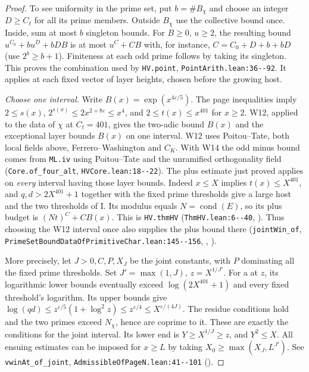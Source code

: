 \begin{proof}
To see uniformity in the prime set, put $b=\#B_\chi$ and choose an
integer $D\ge C_\ell$ for all its prime members. Outside $B_\chi$ use
the collective bound once. Inside, sum at most $b$ singleton bounds.
For $B\ge0$, $u\ge2$, the resulting bound
$u^{C_0}+bu^D+bDB$ is at most $u^{C}+CB$ with, for instance,
$C=C_0+D+b+bD$ (use $2^b\ge b+1$).
Finiteness at each odd prime follows by taking its singleton.
This proves the combination used by \nolinkurl{HV.point},
\nolinkurl{PointArith.lean:36--92}. It applies at each fixed vector
of layer heights, chosen before the growing host.

\emph{Choose one interval.}
Write $B(x)=\exp(x^{4\varepsilon/5})$. The page inequalities imply
$2\le s(x)$, $2^{s(x)}\le 2x^{2+8\varepsilon}\le x^4$,
and $2\le t(x)\le x^{401}$ for $x\ge2$.
W12, applied to the data of $\chi$ at $C_t=401$, gives the
two-adic bound $B(x)$ and the exceptional layer bounds $B(x)$ on
one interval. W12 uses Poitou--Tate, both local fields above,
Ferrero--Washington and $C_K$. With W14 the odd minus bound comes
from \nolinkurl{ML.iv} using Poitou--Tate and the unramified
orthogonality field (\nolinkurl{Core.of_four_alt}, \nolinkurl{HVCore.lean:18--22}).
The plus estimate just proved applies on \emph{every} interval
having those layer bounds. Indeed $x\le X$ implies $t(x)\le X^{401}$,
and $q,d>2X^{401}+1$ together with the fixed prime thresholds give
a large host and the two thresholds of I. Its modulus equals
$N=\operatorname{cond}(E)$, so its plus budget is $(Nt)^C+CB(x)$.
This is \nolinkurl{HV.thmHV} (\nolinkurl{ThmHV.lean:6--40},
). Thus choosing the W12 interval once also supplies
the plus bound there (\nolinkurl{jointWin_of},
\nolinkurl{PrimeSetBoundDataOfPrimitiveChar.lean:145--156},
, ).

More precisely, let $J>0,C,P,X_J$ be the joint constants, with $P$
dominating all the fixed prime thresholds. Set $J'=\max(1,J)$,
$z=X^{1/J'}$. For a  at $z$, its logarithmic lower
bounds eventually exceed $\log(2X^{401}+1)$ and every fixed threshold's
logarithm. Its upper bounds give
$\log(qd)\le z^{\varepsilon/5}(1+\log^2 z)\le z^{\varepsilon/4}
\le X^{\varepsilon/(4J)}$. The residue conditions hold and the
two primes exceed $N_\chi$, hence are coprime to it. These are
exactly the conditions for the joint interval. Its lower end is
$Y\ge X^{1/J}\ge z$, and $Y^2\le X$.
All ensuing estimates can be imposed for $x\ge L$ by taking
$X_0\ge\max(X_J,L^{J'})$. See \nolinkurl{vwinAt_of_joint},
\nolinkurl{AdmissibleOfPageN.lean:41--101} ().


\end{proof}
